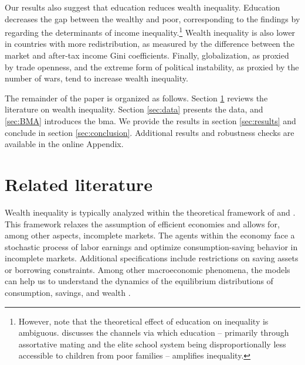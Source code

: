 \documentclass[a4paper,11pt]{article}
\begin{document}
Our results also suggest that education reduces wealth inequality. Education decreases the gap between the wealthy and poor, corresponding to the findings by \citet{dabla2015causes} regarding the determinants of income inequality.\footnote{However, note that the theoretical effect of education on inequality is ambiguous. \citet{scheidel} discusses the channels via which education -- primarily through assortative mating and the elite school system being disproportionally less accessible to children from poor families -- amplifies inequality.} Wealth inequality is also lower in countries with more redistribution, as measured by the difference between the market and after-tax income Gini coefficients. Finally, globalization, as proxied by trade openness, and the extreme form of political instability, as proxied by the number of wars, tend to increase wealth inequality. 

The remainder of the paper is organized as follows. Section \ref{sec:literature} reviews the literature on wealth inequality. Section \ref{sec:data} presents the data, and \ref{sec:BMA} introduces the \ac{bma}. We provide the results in section \ref{sec:results} and conclude in section \ref{sec:conclusion}. Additional results and robustness checks are available in the online Appendix.

\section{Related literature}
\label{sec:literature}

Wealth inequality is typically analyzed within the theoretical framework of \citet{bewley1977permanent} and \citet{Ayiagari1994}. This framework relaxes the assumption of efficient economies and allows for, among other aspects, incomplete markets. The agents within the economy face a stochastic process of labor earnings and optimize consumption-saving behavior in incomplete markets. Additional specifications include restrictions on saving assets or borrowing constraints. Among other macroeconomic phenomena, the models can help us to understand the dynamics of the equilibrium distributions of consumption, savings, and wealth \citep{BENHABIB2015489}.
\end{document}

